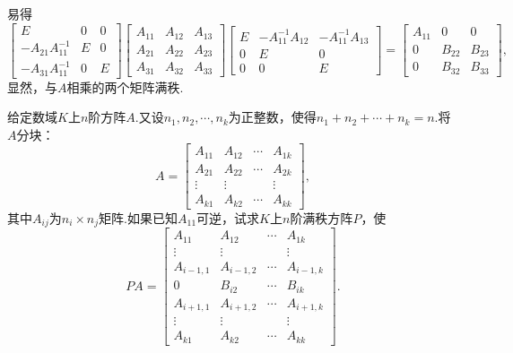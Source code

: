 \begin{sol}
	易得
	\[
		\begin{bmatrix}
			E                  & 0 & 0 \\
			-A_{21}A_{11}^{-1} & E & 0 \\
			-A_{31}A_{11}^{-1} & 0 & E
		\end{bmatrix}\begin{bmatrix}
			A_{11} & A_{12} & A_{13} \\
			A_{21} & A_{22} & A_{23} \\
			A_{31} & A_{32} & A_{33}
		\end{bmatrix}\begin{bmatrix}
			E & -A_{11}^{-1}A_{12} & -A_{11}^{-1}A_{13} \\
			0 & E                  & 0                  \\
			0 & 0                  & E
		\end{bmatrix}=\begin{bmatrix}
			A_{11} & 0      & 0      \\
			0      & B_{22} & B_{23} \\
			0      & B_{32} & B_{33}
		\end{bmatrix},
	\]
	显然，与$A$相乘的两个矩阵满秩.
\end{sol}
\begin{prob}[8]
	给定数域$K$上$n$阶方阵$A$.又设$n_1,n_2,\cdots,n_k$为正整数，使得$n_1+n_2+\cdots+n_k=n$.将$A$分块：
	\[
		A=\begin{bmatrix}
			A_{11} & A_{12} & \cdots & A_{1k} \\
			A_{21} & A_{22} & \cdots & A_{2k} \\
			\vdots & \vdots &        & \vdots \\
			A_{k1} & A_{k2} & \cdots & A_{kk}
		\end{bmatrix},
	\]
	其中$A_{ij}$为$n_i\times n_j$矩阵.如果已知$A_{11}$可逆，试求$K$上$n$阶满秩方阵$P$，使
	\[
		PA=\begin{bmatrix}
			A_{11}    & A_{12}    & \cdots & A_{1k}    \\
			\vdots    & \vdots    &        & \vdots    \\
			A_{i-1,1} & A_{i-1,2} & \cdots & A_{i-1,k} \\
			0         & B_{i2}    & \cdots & B_{ik}    \\
			A_{i+1,1} & A_{i+1,2} & \cdots & A_{i+1,k} \\
			\vdots    & \vdots    &        & \vdots    \\
			A_{k1}    & A_{k2}    & \cdots & A_{kk}
		\end{bmatrix}.
	\]
\end{prob}
